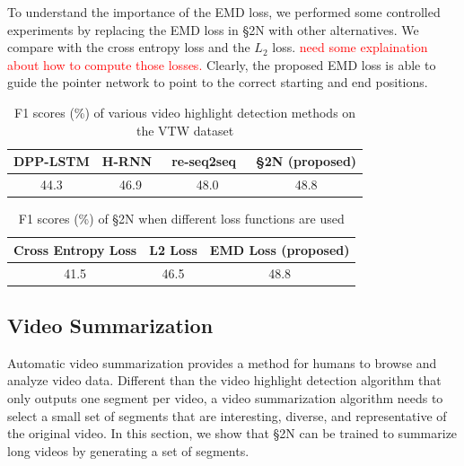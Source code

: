 \documentclass[10pt,journal,compsoc]{IEEEtran}
\begin{document}
 To understand the importance of the EMD loss, we performed some controlled experiments by replacing the EMD loss in \S2N with other alternatives. We compare with the cross entropy loss and the $L_2$ loss. \textcolor{red}{need some explaination about how to compute those losses.} Clearly, the proposed EMD loss is able to guide the pointer network to point to the correct starting and end positions.


\begin{table}
\caption{F1 scores (\%) of various video highlight detection methods on the VTW dataset\label{tab:highlight}}
 \centering
 \begin{tabular}{cccc}
 \toprule
 DPP-LSTM \cite{zhang2016video} & H-RNN~\cite{zhao2017hierarchical} & re-seq2seq~\cite{zhang2018retrospective} & \S2N (proposed)  \\
 \midrule
44.3 & 46.9 & 48.0 & 48.8 \\
 \bottomrule
 \end{tabular}
 \end{table}


\begin{table}
\caption{ F1 scores (\%) of \S2N when different loss functions are used\label{tab:highlight}}
 \centering
 \begin{tabular}{ccc}
 \toprule
 Cross Entropy Loss & L2 Loss & EMD Loss (proposed)  \\
 \midrule
41.5 & 46.5 & 48.8 \\
  \bottomrule
 \end{tabular}
 \end{table}


\subsection{Video Summarization}
Automatic video summarization provides a method for humans to browse and analyze video data. Different than the video highlight detection algorithm that only outputs one segment per video,  a video summarization algorithm needs to select a small set of segments that are interesting, diverse, and representative of the original video. In this section, we show that \S2N can be trained to summarize long videos by generating a set of segments. 
\end{document}
